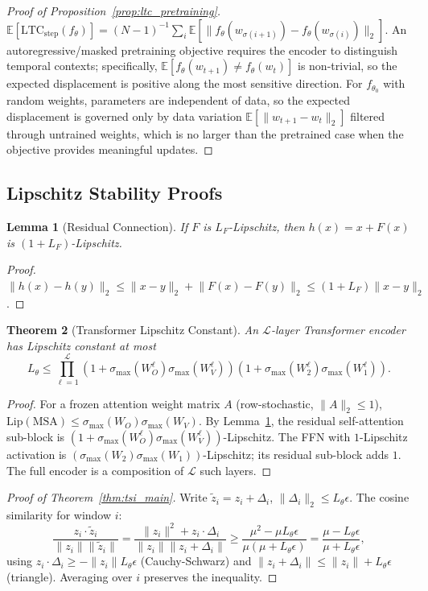 \documentclass[10pt]{article}
\newtheorem{theorem}{Theorem}[section]
\newtheorem{lemma}[theorem]{Lemma}
\theoremstyle{definition}
\theoremstyle{remark}
\newcommand{\E}{\mathbb{E}}
\newcommand{\norm}[1]{\lVert #1 \rVert}
\newcommand{\ltcstep}{\ensuremath{\mathrm{LTC}_{\mathrm{step}}}}
\newcommand{\smax}{\ensuremath{\sigma_{\max}}}
\newcommand{\Lip}{\ensuremath{\mathrm{Lip}}}
\begin{document}
\begin{proof}[Proof of Proposition~\ref{prop:ltc_pretraining}]
$\E[\ltcstep(f_\theta)] = (N-1)^{-1}\sum_i\E[\norm{f_\theta(w_{\sigma(i+1)})
- f_\theta(w_{\sigma(i)})}_2]$.
An autoregressive/masked pretraining objective requires the encoder to
distinguish temporal contexts; specifically,
$\E[f_\theta(w_{t+1}) \neq f_\theta(w_t)]$ is non-trivial, so the expected
displacement is positive along the most sensitive direction.
For $f_{\theta_0}$ with random weights, parameters are independent of data,
so the expected displacement is governed only by data variation
$\E[\norm{w_{t+1}-w_t}_2]$ filtered through untrained weights, which is
no larger than the pretrained case when the objective provides meaningful
updates.
\end{proof}

\subsection{Lipschitz Stability Proofs}
\label{app:stability_proofs}

\begin{lemma}[Residual Connection]
\label{lem:residual_app}
If $F$ is $L_F$-Lipschitz, then $h(x) = x + F(x)$ is $(1+L_F)$-Lipschitz.
\end{lemma}
\begin{proof}
$\norm{h(x)-h(y)}_2 \leq \norm{x-y}_2 + \norm{F(x)-F(y)}_2
\leq (1+L_F)\norm{x-y}_2$.
\end{proof}

\begin{theorem}[Transformer Lipschitz Constant]
\label{thm:transformer_lip_app}
An $\mathcal{L}$-layer Transformer encoder has Lipschitz constant at most
\[
  L_\theta \leq \prod_{\ell=1}^{\mathcal{L}}
  (1+\smax(W_O^\ell)\smax(W_V^\ell))
  (1+\smax(W_2^\ell)\smax(W_1^\ell)).
\]
\end{theorem}
\begin{proof}
For a frozen attention weight matrix $A$ (row-stochastic, $\norm{A}_2\leq 1$),
$\Lip(\mathrm{MSA}) \leq \smax(W_O)\smax(W_V)$.
By Lemma~\ref{lem:residual_app}, the residual self-attention sub-block is
$(1+\smax(W_O^\ell)\smax(W_V^\ell))$-Lipschitz.
The FFN with $1$-Lipschitz activation is $(\smax(W_2)\smax(W_1))$-Lipschitz;
its residual sub-block adds $1$.
The full encoder is a composition of $\mathcal{L}$ such layers.
\end{proof}

\begin{proof}[Proof of Theorem~\ref{thm:tsi_main}]
Write $\tilde{z}_i = z_i + \Delta_i$, $\norm{\Delta_i}_2 \leq L_\theta\epsilon$.
The cosine similarity for window $i$:
\[
  \frac{z_i\cdot\tilde{z}_i}{\norm{z_i}\norm{\tilde{z}_i}}
  = \frac{\norm{z_i}^2 + z_i\cdot\Delta_i}{\norm{z_i}\norm{z_i+\Delta_i}}
  \geq \frac{\mu^2 - \mu L_\theta\epsilon}{\mu(\mu + L_\theta\epsilon)}
  = \frac{\mu - L_\theta\epsilon}{\mu + L_\theta\epsilon},
\]
using $z_i\cdot\Delta_i \geq -\norm{z_i}L_\theta\epsilon$ (Cauchy-Schwarz)
and $\norm{z_i+\Delta_i} \leq \norm{z_i} + L_\theta\epsilon$ (triangle).
Averaging over $i$ preserves the inequality.
\end{proof}
\end{document}
